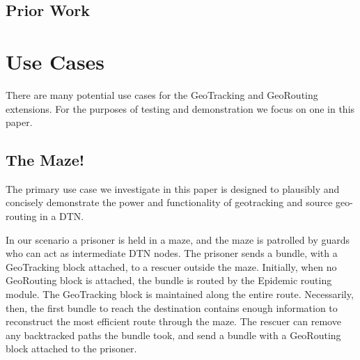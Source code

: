 \documentclass{sig-alternate}
\begin{document}
\subsection {Prior Work}


%
%
\section{Use Cases}

There are many potential use cases for the GeoTracking and GeoRouting extensions.  For the purposes of testing and demonstration we focus on one in this paper.

\subsection{The Maze!}

The primary use case we investigate in this paper is designed to plausibly and concisely demonstrate the power and functionality of geotracking and source geo-routing in a DTN.

In our scenario a prisoner is held in a maze, and the maze is patrolled by guards who can act as intermediate DTN nodes.  The prisoner sends a bundle, with a GeoTracking block attached, to a rescuer outside the maze.  Initially, when no GeoRouting block is attached, the bundle is routed by the Epidemic routing module.  The GeoTracking block is maintained along the entire route.  Necessarily, then, the first bundle to reach the destination contains enough information to reconstruct the most efficient route through the maze.  The rescuer can remove any backtracked paths the bundle took, and send a bundle with a GeoRouting block attached to the prisoner.
\end{document}
